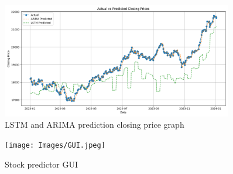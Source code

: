 \newpage

\begin{figure}
	\centering
	\includegraphics[width=0.9\textwidth]{Images/Graph.png}
	\caption{LSTM and ARIMA prediction closing price graph}
	\label{fig:CLosing_price_prediction_graph}
\end{figure}

\begin{figure}
	\centering
	\texttt{[image: Images/GUI.jpeg]}
	\caption{Stock predictor GUI}
	\label{fig:StockPrice_predictor_GUI}
\end{figure}
